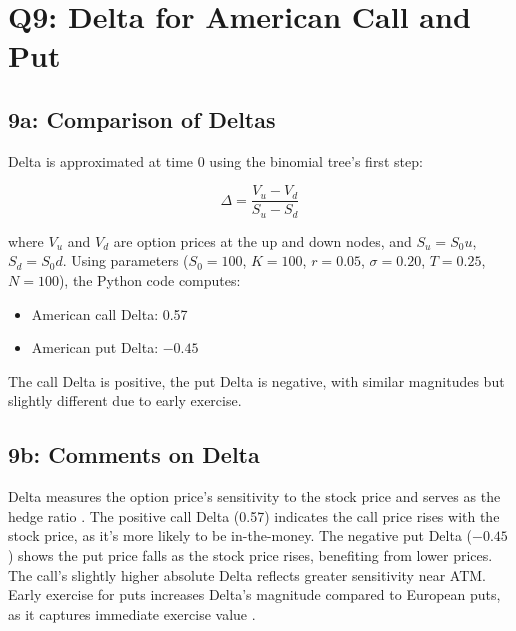 \documentclass{article}
\begin{document}
\section*{Q9: Delta for American Call and Put}

\subsection*{9a: Comparison of Deltas}

Delta is approximated at time 0 using the binomial tree’s first step:

\begin{equation}
\Delta = \frac{V_u - V_d}{S_u - S_d}
\end{equation}

where $V_u$ and $V_d$ are option prices at the up and down nodes, and $S_u = S_0 u$, $S_d = S_0 d$. Using parameters ($S_0 = 100$, $K = 100$, $r = 0.05$, $\sigma = 0.20$, $T = 0.25$, $N = 100$), the Python code computes:

\begin{itemize}
    \item American call Delta: 0.57
    \item American put Delta: $-0.45$
\end{itemize}

The call Delta is positive, the put Delta is negative, with similar magnitudes but slightly different due to early exercise.

\subsection*{9b: Comments on Delta}

Delta measures the option price’s sensitivity to the stock price and serves as the hedge ratio \citep{hull2018options}. The positive call Delta (0.57) indicates the call price rises with the stock price, as it’s more likely to be in-the-money. The negative put Delta ($-0.45$) shows the put price falls as the stock price rises, benefiting from lower prices. The call’s slightly higher absolute Delta reflects greater sensitivity near ATM. Early exercise for puts increases Delta’s magnitude compared to European puts, as it captures immediate exercise value \citep{shreve2004stochastic}.




\end{document}
